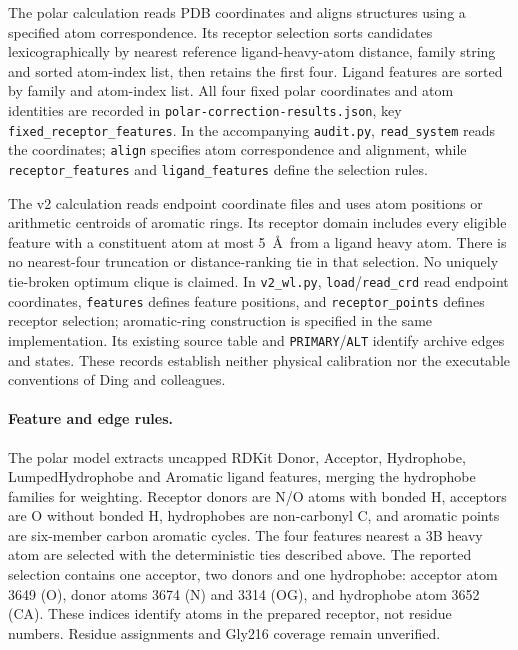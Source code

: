 \documentclass{article}
\begin{document}
The polar calculation reads PDB coordinates and aligns structures using a specified atom correspondence. Its receptor selection sorts candidates lexicographically by nearest reference ligand-heavy-atom distance, family string and sorted atom-index list, then retains the first four. Ligand features are sorted by family and atom-index list. All four fixed polar coordinates and atom identities are recorded in \texttt{polar-correction-results.json}, key \texttt{fixed\_receptor\_features}. In the accompanying \texttt{audit.py}, \texttt{read\_system} reads the coordinates; \texttt{align} specifies atom correspondence and alignment, while \texttt{receptor\_features} and \texttt{ligand\_features} define the selection rules.

The v2 calculation reads endpoint coordinate files and uses atom positions or arithmetic centroids of aromatic rings. Its receptor domain includes every eligible feature with a constituent atom at most 5~\AA\ from a ligand heavy atom. There is no nearest-four truncation or distance-ranking tie in that selection. No uniquely tie-broken optimum clique is claimed. In \texttt{v2\_wl.py}, \texttt{load}/\texttt{read\_crd} read endpoint coordinates, \texttt{features} defines feature positions, and \texttt{receptor\_points} defines receptor selection; aromatic-ring construction is specified in the same implementation. Its existing source table and \texttt{PRIMARY}/\texttt{ALT} identify archive edges and states. These records establish neither physical calibration nor the executable conventions of Ding and colleagues.

\paragraph{Feature and edge rules.}
The polar model extracts uncapped RDKit Donor, Acceptor, Hydrophobe, LumpedHydrophobe and Aromatic ligand features, merging the hydrophobe families for weighting. Receptor donors are N/O atoms with bonded H, acceptors are O without bonded H, hydrophobes are non-carbonyl C, and aromatic points are six-member carbon aromatic cycles. The four features nearest a 3B heavy atom are selected with the deterministic ties described above. The reported selection contains one acceptor, two donors and one hydrophobe: acceptor atom 3649 (O), donor atoms 3674 (N) and 3314 (OG), and hydrophobe atom 3652 (CA). These indices identify atoms in the prepared receptor, not residue numbers. Residue assignments and Gly216 coverage remain unverified.
\end{document}
